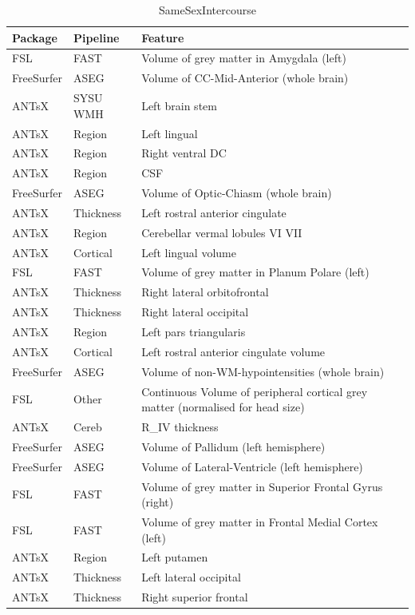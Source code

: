 \documentclass[
  10pt,
]{article}
\begin{document}
\begin{table}

\caption{\label{tab:compare-predictions}SameSexIntercourse}
\centering
\begin{tabular}[t]{lll}
\toprule
Package & Pipeline & Feature\\
\midrule
FSL & FAST & Volume of grey matter in Amygdala (left)\\
FreeSurfer & ASEG & Volume of CC-Mid-Anterior (whole brain)\\
ANTsX & SYSU WMH & Left brain stem\\
ANTsX & Region & Left lingual\\
ANTsX & Region & Right ventral DC\\
\addlinespace
ANTsX & Region & CSF\\
FreeSurfer & ASEG & Volume of Optic-Chiasm (whole brain)\\
ANTsX & Thickness & Left rostral anterior cingulate\\
ANTsX & Region & Cerebellar vermal lobules VI VII\\
ANTsX & Cortical & Left lingual volume\\
\addlinespace
FSL & FAST & Volume of grey matter in Planum Polare (left)\\
ANTsX & Thickness & Right lateral orbitofrontal\\
ANTsX & Thickness & Right lateral occipital\\
ANTsX & Region & Left pars triangularis\\
ANTsX & Cortical & Left rostral anterior cingulate volume\\
\addlinespace
FreeSurfer & ASEG & Volume of non-WM-hypointensities (whole brain)\\
FSL & Other & Continuous    Volume of peripheral cortical grey matter (normalised for head size)\\
ANTsX & Cereb & R\_IV thickness\\
FreeSurfer & ASEG & Volume of Pallidum (left hemisphere)\\
FreeSurfer & ASEG & Volume of Lateral-Ventricle (left hemisphere)\\
\addlinespace
FSL & FAST & Volume of grey matter in Superior Frontal Gyrus (right)\\
FSL & FAST & Volume of grey matter in Frontal Medial Cortex (left)\\
ANTsX & Region & Left putamen\\
ANTsX & Thickness & Left lateral occipital\\
ANTsX & Thickness & Right superior frontal\\
\bottomrule
\end{tabular}
\end{table}
\end{document}
